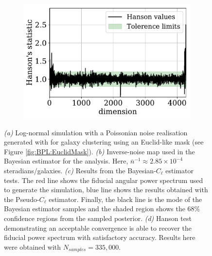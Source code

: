 \begin{figure}
\begin{subfigure}{.5\textwidth}
  \caption{}
  \label{fig:BPL:LN-LowSN-Cls}
\end{subfigure}
\begin{subfigure}{.5\textwidth}
  \centering
  \includegraphics[scale=0.50]{BPL-FIGS/Euclid-Foot-LN-PoiNoi-N32_Hanson.pdf}
    \caption{}
    \label{fig:BPL:LN-LowSN-Hanson}
\end{subfigure}
\caption[Bayesian-$C_{\ell}$ estimator tested on a Euclid-like \flask log-normal simulation with low signal-to-noise.]{\textit{(a)} Log-normal simulation with a Poissonian noise realisation generated with \flask for galaxy clustering using an Euclid-like mask (see Figure \ref{fig:BPL:EuclidMask}). \textit{(b)} Inverse-noise map used in the Bayesian estimator for the analysis. Here, $\bar{n}^{-1}\approx 2.85\times 10^{-4}$ steradians/galaxies. \textit{(c)} Results from the Bayesian-$C_{\ell}$ estimator tests. The red line shows the fiducial angular power spectrum used to generate the simulation, blue line shows the results obtained with the Pseudo-$C_{\ell}$ estimator. Finally, the black line is the mode of the Bayesian estimator samples and the shaded region shows the 68\% confidence regions from the sampled posterior. \textit{(d)} Hanson test demonstrating an acceptable convergence is able to recover the fiducial power spectrum with satisfactory accuracy. Results here were obtained with $N_{samples} = 335,000$.}
\label{fig:BPL:LogNormalFSAnalysis}
\end{figure}

